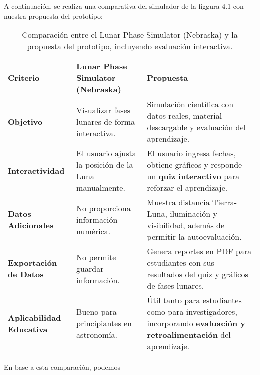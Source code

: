 A continuación, se realiza una comparativa del simulador de la figgura 4.1 con nuestra propuesta del prototipo:

\begin{table}[H]
    \centering
    \begin{tabular}{|p{4.5cm}|p{5.5cm}|p{5.5cm}|}
        \hline
        \textbf{Criterio} & \textbf{Lunar Phase Simulator (Nebraska)} & \textbf{Propuesta} \\
        \hline
        \textbf{Objetivo} & Visualizar fases lunares de forma interactiva. & Simulación científica con datos reales, material descargable y evaluación del aprendizaje. \\
        \hline
        \textbf{Interactividad} & El usuario ajusta la posición de la Luna manualmente. & El usuario ingresa fechas, obtiene gráficos y responde un \textbf{quiz interactivo} para reforzar el aprendizaje. \\
        \hline
        \textbf{Datos Adicionales} & No proporciona información numérica. & Muestra distancia Tierra-Luna, iluminación y visibilidad, además de permitir la autoevaluación. \\
        \hline
        \textbf{Exportación de Datos} & No permite guardar información. & Genera reportes en PDF para estudiantes con sus resultados del quiz y gráficos de fases lunares. \\
        \hline
        \textbf{Aplicabilidad Educativa} & Bueno para principiantes en astronomía. & Útil tanto para estudiantes como para investigadores, incorporando \textbf{evaluación y retroalimentación} del aprendizaje. \\
        \hline
    \end{tabular}
    \label{tab:comparacion}
    \caption{Comparación entre el Lunar Phase Simulator (Nebraska) y la propuesta del prototipo, incluyendo evaluación interactiva.}
\end{table}


En base a esta comparación, podemos


